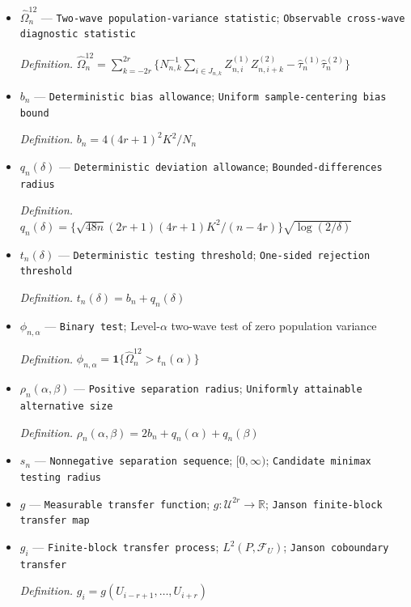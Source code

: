 \documentclass{article}
\begin{document}
\begin{itemize}
  \par\smallskip\noindent\emph{Definition.} \(\widehat\tau_n^{(2)}=N_n^{-1}\sum_{i\in I_n}Z_{n,i}^{(2)}\)
  \item \(\widehat\Omega_n^{12}\) --- \texttt{Two-\allowbreak{}wave population-\allowbreak{}variance statistic}; \texttt{Observable cross-\allowbreak{}wave diagnostic statistic}
  \par\smallskip\noindent\emph{Definition.} \(\widehat\Omega_n^{12}=\sum_{k=-2r}^{2r}\{N_{n,k}^{-1}\sum_{i\in J_{n,k}}Z_{n,i}^{(1)}Z_{n,i+k}^{(2)}-\widehat\tau_n^{(1)}\widehat\tau_n^{(2)}\}\)
  \item \(b_n\) --- \texttt{Deterministic bias allowance}; \texttt{Uniform sample-\allowbreak{}centering bias bound}
  \par\smallskip\noindent\emph{Definition.} \(b_n=4(4r+1)^2K^2/N_n\)
  \item \(q_n(\delta)\) --- \texttt{Deterministic deviation allowance}; \texttt{Bounded-\allowbreak{}differences radius}
  \par\smallskip\noindent\emph{Definition.} \(q_n(\delta)=\{\sqrt{48n}(2r+1)(4r+1)K^2/(n-4r)\}\sqrt{\log(2/\delta)}\)
  \item \(t_n(\delta)\) --- \texttt{Deterministic testing threshold}; \texttt{One-\allowbreak{}sided rejection threshold}
  \par\smallskip\noindent\emph{Definition.} \(t_n(\delta)=b_n+q_n(\delta)\)
  \item \(\phi_{n,\alpha}\) --- \texttt{Binary test}; Level-\(\alpha\) two-wave test of zero population variance
  \par\smallskip\noindent\emph{Definition.} \(\phi_{n,\alpha}=\mathbf 1\{\widehat\Omega_n^{12}>t_n(\alpha)\}\)
  \item \(\rho_n(\alpha,\beta)\) --- \texttt{Positive separation radius}; \texttt{Uniformly attainable alternative size}
  \par\smallskip\noindent\emph{Definition.} \(\rho_n(\alpha,\beta)=2b_n+q_n(\alpha)+q_n(\beta)\)
  \item \(s_n\) --- \texttt{Nonnegative separation sequence}; \([0,\infty)\); \texttt{Candidate minimax testing radius}
  \item \(g\) --- \texttt{Measurable transfer function}; \(g:\mathcal U^{2r}\to\mathbb R\); \texttt{Janson finite-\allowbreak{}block transfer map}
  \item \(g_i\) --- \texttt{Finite-\allowbreak{}block transfer process}; \(L^2(P,\mathcal F_U)\); \texttt{Janson coboundary transfer}
  \par\smallskip\noindent\emph{Definition.} \(g_i=g(U_{i-r+1},\ldots,U_{i+r})\)

\end{itemize}
\end{document}
